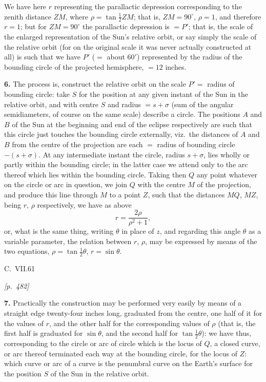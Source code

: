 \documentclass[11pt]{article}
\begin{document}
We have here $r$ representing the parallactic depression corresponding to
the zenith distance $ZM$, where $\rho = \tan\tfrac{1}{2}ZM$; that is,
$ZM = 90^{\circ}$, $\rho = 1$, and therefore $r = 1$; but for
$ZM = 90^{\circ}$ the parallactic depression is $=P'$; that is, the scale
of the enlarged representation of the Sun's relative orbit, or say simply
the scale of the relative orbit (for on the original scale it was never
actually constructed at all) is such that we have $P'$ ($=$ about $60'$)
represented by the radius of the bounding circle of the projected
hemisphere, $=12$ inches.

\medskip

\textbf{6.} The process is, construct the relative orbit on the scale
$P' = $ radius of bounding circle: take $S$ for the position at any given
instant of the Sun in the relative orbit, and with centre $S$ and radius
$=s+\sigma$ (sum of the angular semidiameters, of course on the same
scale) describe a circle. The positions $A$ and $B$ of the Sun at the
beginning and end of the eclipse respectively are such that this circle
just touches the bounding circle externally, viz.\ the distances of $A$
and $B$ from the centre of the projection are each $=$ radius of bounding
circle $-(s+\sigma)$. At any intermediate instant the circle, radius
$s+\sigma$, lies wholly or partly within the bounding circle; in the
latter case we attend only to the arc thereof which lies within the
bounding circle. Taking then $Q$ any point whatever on the circle or arc
in question, we join $Q$ with the centre $M$ of the projection, and
produce this line through $M$ to a point $Z$, such that the distances
$MQ$, $MZ$, being $r$, $\rho$ respectively, we have as above
\[
r = \frac{2\rho}{\rho^{2}+1},
\]
or, what is the same thing, writing $\theta$ in place of $z$, and
regarding this angle $\theta$ as a variable parameter, the relation
between $r$, $\rho$, may be expressed by means of the two equations,
$\rho = \tan\tfrac{1}{2}\theta$, $r = \sin\theta$.

\medskip

\hfill C.\ VII.\hfill 61

\medskip

\noindent\textit{[p.~482]}

\medskip

\textbf{7.} Practically the construction may be performed very easily by
means of a straight edge twenty-four inches long, graduated from the
centre, one half of it for the values of $r$, and the other half for the
corresponding values of $\rho$ (that is, the first half is graduated for
$\sin\theta$, and the second half for $\tan\tfrac{1}{2}\theta$): we have
thus, corresponding to the circle or arc of circle which is the locus of
$Q$, a closed curve, or arc thereof terminated each way at the bounding
circle, for the locus of $Z$: which curve or arc of a curve is the
penumbral curve on the Earth's surface for the position $S$ of the Sun in
the relative orbit.
\end{document}
